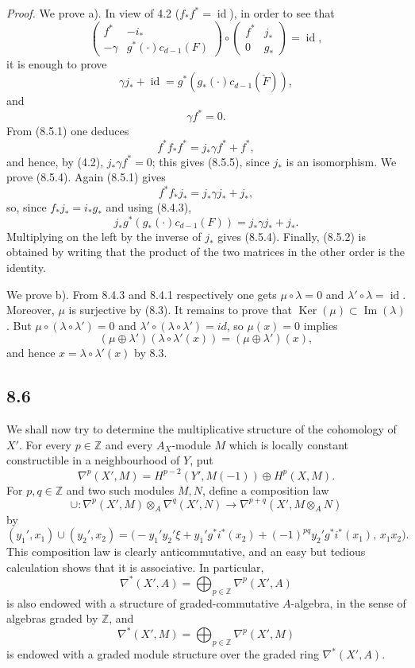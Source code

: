 \documentclass[11pt]{article}
\providecommand{\Ker}{\operatorname{Ker}}
\providecommand{\Ker}{\operatorname{Ker}}
\providecommand{\Ker}{\operatorname{Ker}}
\begin{document}
\emph{Proof.} We prove a). In view of 4.2 ($f_*f^*=\operatorname{id}$), in order to see that
\[
\begin{pmatrix}
f^*&-i_*\\
-\gamma&g^*(\cdot)c_{d-1}( F)
\end{pmatrix}
\circ
\begin{pmatrix}
f^*&j_*\\
0&g_*
\end{pmatrix}
=\operatorname{id},
\]
it is enough to prove
\[
\gamma j_*+\operatorname{id}=g^*(g_*(\cdot)c_{d-1}(\check F)),
\tag{8.5.4}
\]
and
\[
\gamma f^*=0.
\tag{8.5.5}
\]
From (8.5.1) one deduces
\[
f^*f_*f^*=j_*\gamma f^*+f^*,
\]
and hence, by (4.2), $j_*\gamma f^*=0$; this gives (8.5.5), since $j_*$ is an isomorphism. We prove (8.5.4). Again (8.5.1) gives
\[
f^*f_*j_*=j_*\gamma j_*+j_*,
\]
so, since $f_*j_*=i_*g_*$ and using (8.4.3),
\[
j_*g^*(g_*(\cdot)c_{d-1}( F))=j_*\gamma j_*+j_*.
\]
Multiplying on the left by the inverse of $j_*$ gives (8.5.4). Finally, (8.5.2) is obtained by writing that the product of the two matrices in the other order is the identity.

We prove b). From 8.4.3 and 8.4.1 respectively one gets $\mu\circ\lambda=0$ and $\lambda'\circ\lambda=\operatorname{id}$. Moreover, $\mu$ is surjective by (8.3). It remains to prove that $\Ker(\mu)\subset\operatorname{Im}(\lambda)$. But $\mu\circ(\lambda\circ\lambda')=0$ and $\lambda'\circ(\lambda\circ\lambda')=id$, so $\mu(x)=0$ implies
\[
(\mu\oplus\lambda')(\lambda\circ\lambda'(x))=(\mu\oplus\lambda')(x),
\]
and hence $x=\lambda\circ\lambda'(x)$ by 8.3.

\subsection*{8.6}

We shall now try to determine the multiplicative structure of the cohomology of $X'$. For every $p\in\mathbb Z$ and every $A_X$-module $M$ which is locally constant constructible in a neighbourhood of $Y$, put
\[
\nabla^p(X',M)=H^{p-2}(Y',M(-1))\oplus H^p(X,M).
\]
For $p,q\in\mathbb Z$ and two such modules $M,N$, define a composition law
\[
\cup:\nabla^p(X',M)\otimes_A\nabla^q(X',N)\to
\nabla^{p+q}(X',M\otimes_A N)
\tag{8.6.1}
\]
by
\[
(y_1',x_1)\cup(y_2',x_2)=
\bigl(-y_1'y_2'\xi+y_1'g^*i^*(x_2)+(-1)^{pq}y_2'g^*i^*(x_1),\,x_1x_2\bigr).
\tag{8.6.2}
\]
This composition law is clearly anticommutative, and an easy but tedious calculation shows that it is associative. In particular,
\[
\nabla^*(X',A)=\bigoplus_{p\in\mathbb Z}\nabla^p(X',A)
\]
is also endowed with a structure of graded-commutative $A$-algebra, in the sense of algebras graded by $\mathbb Z$, and
\[
\nabla^*(X',M)=\bigoplus_{p\in\mathbb Z}\nabla^p(X',M)
\]
is endowed with a graded module structure over the graded ring $\nabla^*(X',A)$.
\end{document}
